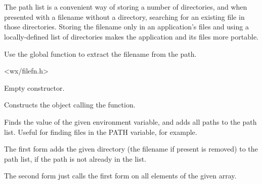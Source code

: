 \section{}\label{wxpathlist}

The path list is a convenient way of storing a number of directories, and
when presented with a filename without a directory, searching for an existing file
in those directories.  Storing the filename only in an application's files and
using a locally-defined list of directories makes the application and its files more
portable.

Use the  global function 
to extract the filename from the path.




<wx/filefn.h>





\label{wxpathlistctor}


Empty constructor.


Constructs the object calling the  function.


\label{wxpathlistaddenvlist}


Finds the value of the given environment variable, and adds all paths
to the path list. Useful for finding files in the PATH variable, for
example.


\label{wxpathlistadd}



The first form adds the given directory (the filename if present is removed)
to the path list, if the path is not already in the list.

The second form just calls the first form on all elements of the given array.


